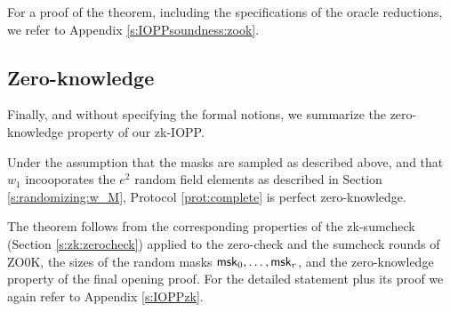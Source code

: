 For a proof of the theorem, including the specifications of the oracle reductions, we refer to Appendix \ref{s:IOPPsoundness:zook}.



\subsection{Zero-knowledge}

Finally, and without specifying the formal notions, we summarize the zero-knowledge property of our zk-IOPP.

\begin{thm}
\label{thm:IOPPzk:complete:informal}
Under the assumption that the masks are sampled as described above, and that $w_1$ incooporates the $e^2$ random field elements as described in Section \ref{s:randomizing:w_M}, 
Protocol \ref{prot:complete} is perfect zero-knowledge. 
\end{thm}

The theorem follows from the corresponding properties of the zk-sumcheck (Section \ref{s:zk:zerocheck}) applied to the zero-check and the sumcheck rounds of ZO0K, the sizes of the random masks $\mathsf{msk}_0,\ldots, \mathsf{msk}_r$, and the zero-knowledge property of the final opening proof.
For the detailed statement plus its proof we again refer to Appendix \ref{s:IOPPzk}.